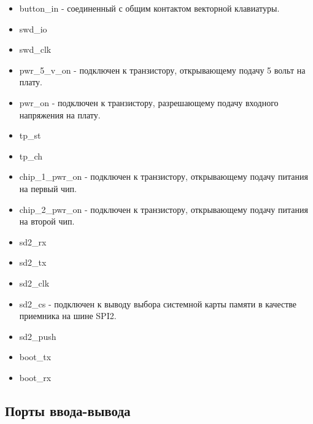 \documentclass[a4paper, 12pt]{article}
\begin{document}
\begin{itemize}
	\item button\_in - соединенный с общим контактом векторной клавиатуры.
	\item swd\_io
	\item swd\_clk
	\item pwr\_5\_v\_on - подключен к транзистору, открывающему подачу 5 вольт на плату.
	\item pwr\_on - подключен к транзистору, разрешающему подачу входного напряжения на плату.
	\item tp\_st
	\item tp\_ch
	\item chip\_1\_pwr\_on - подключен к транзистору, открывающему подачу питания на первый чип.
	\item chip\_2\_pwr\_on - подключен к транзистору, открывающему подачу питания на второй чип.
	\item sd2\_rx
	\item sd2\_tx
	\item sd2\_clk
	\item sd2\_cs - подключен к выводу выбора системной карты памяти в качестве приемника на шине SPI2.
	\item sd2\_push
	\item boot\_tx
	\item boot\_rx
\end{itemize}

\subsection{Порты ввода-вывода}
\end{document}
